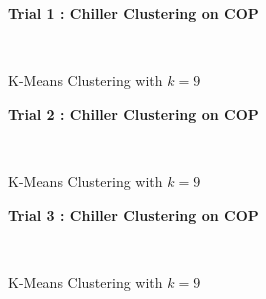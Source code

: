 \begin{figure}[!h]
\centerline{\bfseries\Large Trial 1 : Chiller Clustering on COP}\\
\caption{K-Means Clustering with $k=9$}
\end{figure}
\begin{figure}[!h]
\centerline{\bfseries\Large Trial 2 : Chiller Clustering on COP}\\
\caption{K-Means Clustering with $k=9$}
\end{figure}
\begin{figure}[!h]
\centerline{\bfseries\Large Trial 3 : Chiller Clustering on COP}\\
\caption{K-Means Clustering with $k=9$}
\end{figure}
